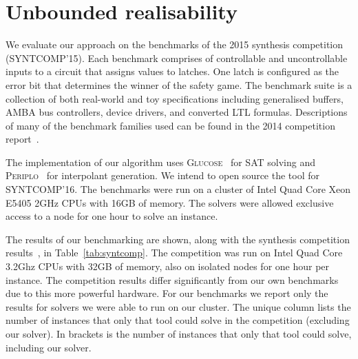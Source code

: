 \section{Unbounded realisability}

We evaluate our approach on the benchmarks of the 2015 synthesis competition
(SYNTCOMP'15). Each benchmark comprises of controllable and uncontrollable
inputs to a circuit that assigns values to latches. One latch is configured as
the error bit that determines the winner of the safety game. The benchmark
suite is a collection of both real-world and toy specifications including
generalised buffers, AMBA bus controllers, device drivers, and converted LTL
formulas.  Descriptions of many of the benchmark families used can be found in
the 2014 competition report~\cite{jacobs2015}. 

The implementation of our algorithm uses \textsc{Glucose}~\cite{audemard2014}
for SAT solving and \textsc{Periplo}~\cite{rollini2013} for interpolant
generation. We intend to open source the tool for SYNTCOMP'16. The benchmarks
were run on a cluster of Intel Quad Core Xeon E5405 2GHz CPUs with 16GB of
memory.  The solvers were allowed exclusive access to a node for one hour to
solve an instance. 

The results of our benchmarking are shown, along with the synthesis competition
results~\cite{syntcompedacc}, in Table~\ref{tab:syntcomp}. The competition was
run on Intel Quad Core 3.2Ghz CPUs with 32GB of memory, also on isolated nodes
for one hour per instance. The competition results differ significantly from
our own benchmarks due to this more powerful hardware.  For our benchmarks we
report only the results for solvers we were able to run on our cluster. The
unique column lists the number of instances that only that tool could solve in
the competition (excluding our solver). In brackets is the number of instances
that only that tool could solve, including our solver.

